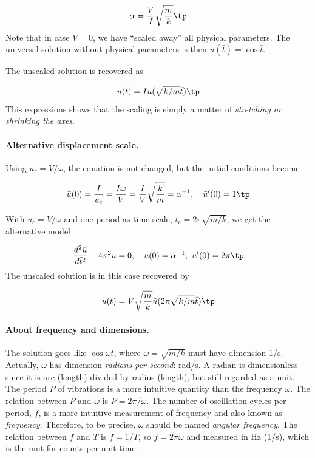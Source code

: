 \documentclass[graybox,envcountchap,sectrefs,final]{svmonodo}
\begin{document}
\[ \alpha = \frac{V}{I}\sqrt{\frac{m}{k}}\tp\]
Note that in case $V=0$, we have ``scaled away'' all physical parameters.
The universal solution without physical parameters is then
$\bar u(\bar t)=\cos\bar t$.

The unscaled solution is recovered as

\begin{equation}
u(t) = I\bar u(\sqrt{k/m}\bar t)\tp
\end{equation}
This expressions shows that the scaling is simply a matter of
\emph{stretching or shrinking the axes}.

\paragraph{Alternative displacement scale.}
Using $u_c = V/\omega$, the equation
is not changed, but the initial conditions become

\[ \bar u(0) = \frac{I}{u_c} = \frac{I\omega}{V} =\frac{I}{V}\sqrt{\frac{k}{m}} = \alpha^{-1},\quad \bar u'(0)=1\tp\]


With $u_c=V/\omega$ and one period as time scale,
$t_c=2\pi\sqrt{m/k}$,
we get the alternative model

\begin{equation}
\frac{d^2\bar u}{d\bar t^2} + 4\pi^2 \bar u = 0,
\quad \bar u(0)=\alpha^{-1},\ \bar u'(0)=2\pi\tp
\label{sec:scale:vib:undamped:model:scaled2}
\end{equation}
The unscaled solution is in this case recovered by

\begin{equation}
u(t) = V\sqrt{\frac{m}{k}}\bar u(2\pi\sqrt{k/m}\bar t)\tp
\end{equation}


\paragraph{About frequency and dimensions.}
The solution goes like $\cos\omega t$, where $\omega =\sqrt{m/k}$
must have dimension 1/s. Actually, $\omega$ has dimension \emph{radians
per second}: rad/s. A radian is dimensionless since it is arc (length)
divided by radius (length), but still regarded as a unit.
The period $P$ of vibrations is a more intuitive quantity than the frequency
$\omega$. The relation between $P$ and $\omega$ is $P=2\pi/\omega$.
The number of oscillation cycles per period, $f$, is a more intuitive
measurement of frequency and also known as \emph{frequency}. Therefore, to be
precise, $\omega$ should be named \emph{angular frequency}. The relation between
$f$ and $T$ is $f=1/T$, so $f=2\pi\omega$ and measured in Hz (1/s), which is
the unit for counts per unit time.
\end{document}
